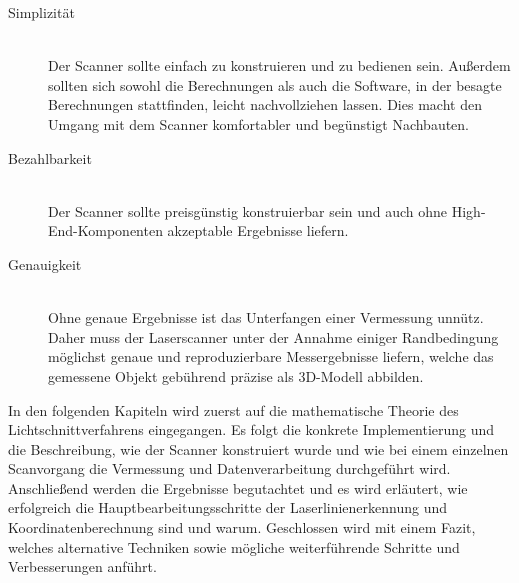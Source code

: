 \begin{description}
\item[Simplizität] \hfill \\
Der Scanner sollte einfach zu konstruieren und zu bedienen sein. Außerdem sollten sich sowohl die Berechnungen als auch die Software, in der besagte Berechnungen stattfinden, leicht nachvollziehen lassen. Dies macht den Umgang mit dem Scanner komfortabler und begünstigt Nachbauten.
\item[Bezahlbarkeit] \hfill \\		
Der Scanner sollte preisgünstig konstruierbar sein und auch ohne High-End-Komponenten akzeptable Ergebnisse liefern.  
\item[Genauigkeit] \hfill \\  		
Ohne genaue Ergebnisse ist das Unterfangen einer Vermessung unnütz. Daher muss der Laserscanner unter der Annahme einiger Randbedingung möglichst genaue und reproduzierbare Messergebnisse liefern, welche das gemessene Objekt gebührend präzise als 3D-Modell abbilden.
\end{description}
In den folgenden Kapiteln wird zuerst auf die mathematische Theorie des Lichtschnittverfahrens eingegangen. Es folgt die konkrete Implementierung und die Beschreibung, wie der Scanner konstruiert wurde und wie bei einem einzelnen Scanvorgang die Vermessung und Datenverarbeitung durchgeführt wird. Anschließend werden die Ergebnisse begutachtet und es wird erläutert, wie erfolgreich die Hauptbearbeitungsschritte der Laserlinienerkennung und Koordinatenberechnung sind und warum. Geschlossen wird mit einem Fazit, welches alternative Techniken sowie mögliche weiterführende Schritte und Verbesserungen anführt.  

